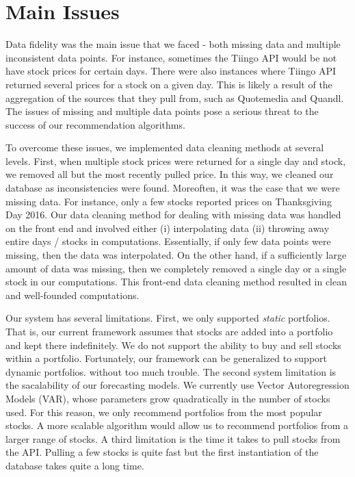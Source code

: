 \documentclass{article}
\begin{document}
\section{Main Issues} \label{sec:main_issues}
Data fidelity was the main issue that we faced - both missing data and multiple inconsistent data points. For instance, sometimes the Tiingo API would be not have stock prices for certain days. There were also instances where Tiingo API returned several prices for a stock on a given day. This is likely a result of the aggregation of the sources that they pull from, such as Quotemedia and Quandl. The issues of missing and multiple data points pose a serious threat to the success of our recommendation algorithms.

To overcome these issues, we implemented data cleaning methods at several levels. First, when multiple stock prices were returned for a single day and stock, we removed all but the most recently pulled price. In this way, we cleaned our database as inconsistencies were found. Moreoften, it was the case that we were missing data. For instance, only a few stocks reported prices on Thanksgiving Day 2016. Our data cleaning method for dealing with missing data was handled on the front end and involved either (i) interpolating data (ii) throwing away entire days / stocks in computations. Essentially, if only few data points were missing, then the data was interpolated. On the other hand, if a sufficiently large amount of data was missing, then we completely removed a single day or a single stock in our computations. This front-end data cleaning method resulted in clean and well-founded computations.

Our system has several limitations. First, we only supported \emph{static} portfolios. That is, our current framework assumes that stocks are added into a portfolio and kept there indefinitely. We do not support the ability to buy and sell stocks within a portfolio. Fortunately, our framework can be generalized to support dynamic portfolios. without too much trouble. The second system limitation is the sacalability of our forecasting models. We currently use Vector Autoregression Models (VAR), whose parameters grow quadratically in the number of stocks used. For this reason, we only recommend portfolios from the most popular stocks. A more scalable algorithm would allow us to recommend portfolios from a larger range of stocks. A third limitation is the time it takes to pull stocks from the API. Pulling a few stocks is quite fast but the first instantiation of the database takes quite a long time.
\end{document}
